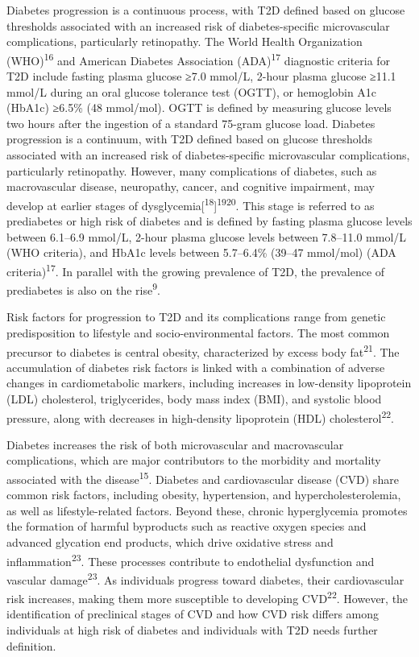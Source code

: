 \documentclass[
  a4paper,
  headsepline=true,
  open=any]{scrbook}
\begin{document}
Diabetes progression is a continuous process, with T2D defined based on
glucose thresholds associated with an increased risk of
diabetes-specific microvascular complications, particularly retinopathy.
The World Health Organization (WHO)\textsuperscript{16} and American
Diabetes Association (ADA)\textsuperscript{17} diagnostic criteria for
T2D include fasting plasma glucose ≥7.0 mmol/L, 2-hour plasma glucose
≥11.1 mmol/L during an oral glucose tolerance test (OGTT), or hemoglobin
A1c (HbA1c) ≥6.5\% (48 mmol/mol). OGTT is defined by measuring glucose
levels two hours after the ingestion of a standard 75-gram glucose load.
Diabetes progression is a continuum, with T2D defined based on glucose
thresholds associated with an increased risk of diabetes-specific
microvascular complications, particularly retinopathy. However, many
complications of diabetes, such as macrovascular disease, neuropathy,
cancer, and cognitive impairment, may develop at earlier stages of
dysglycemia{[}\textsuperscript{18}{]}\textsuperscript{19}\textsuperscript{20}.
This stage is referred to as prediabetes or high risk of diabetes and is
defined by fasting plasma glucose levels between 6.1--6.9 mmol/L, 2-hour
plasma glucose levels between 7.8--11.0 mmol/L (WHO criteria), and HbA1c
levels between 5.7--6.4\% (39--47 mmol/mol) (ADA
criteria)\textsuperscript{17}. In parallel with the growing prevalence
of T2D, the prevalence of prediabetes is also on the
rise\textsuperscript{9}.

Risk factors for progression to T2D and its complications range from
genetic predisposition to lifestyle and socio-environmental factors. The
most common precursor to diabetes is central obesity, characterized by
excess body fat\textsuperscript{21}. The accumulation of diabetes risk
factors is linked with a combination of adverse changes in
cardiometabolic markers, including increases in low-density lipoprotein
(LDL) cholesterol, triglycerides, body mass index (BMI), and systolic
blood pressure, along with decreases in high-density lipoprotein (HDL)
cholesterol\textsuperscript{22}.

Diabetes increases the risk of both microvascular and macrovascular
complications, which are major contributors to the morbidity and
mortality associated with the disease\textsuperscript{15}. Diabetes and
cardiovascular disease (CVD) share common risk factors, including
obesity, hypertension, and hypercholesterolemia, as well as
lifestyle-related factors. Beyond these, chronic hyperglycemia promotes
the formation of harmful byproducts such as reactive oxygen species and
advanced glycation end products, which drive oxidative stress and
inflammation\textsuperscript{23}. These processes contribute to
endothelial dysfunction and vascular damage\textsuperscript{23}. As
individuals progress toward diabetes, their cardiovascular risk
increases, making them more susceptible to developing
CVD\textsuperscript{22}. However, the identification of preclinical
stages of CVD and how CVD risk differs among individuals at high risk of
diabetes and individuals with T2D needs further definition.
\end{document}
